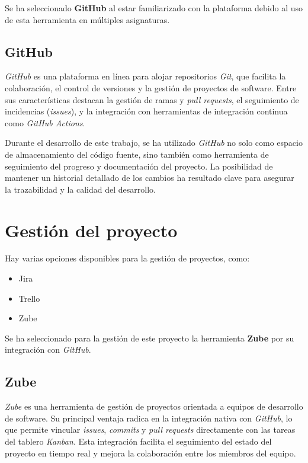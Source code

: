 Se ha seleccionado \textbf{GitHub} al estar familiarizado con la plataforma debido al uso de esta herramienta en múltiples asignaturas.

\subsection{GitHub}

\textit{GitHub} es una plataforma en línea para alojar repositorios \textit{Git}, que
facilita la colaboración, el control de versiones y la gestión de proyectos de software. 
Entre sus características destacan la gestión de ramas y \textit{pull requests}, el seguimiento 
de incidencias (\textit{issues}), y la integración con herramientas de integración continua como 
\textit{GitHub Actions}.

Durante el desarrollo de este trabajo, se ha utilizado \textit{GitHub} no solo como espacio de almacenamiento del código fuente, 
sino también como herramienta de seguimiento del progreso y documentación del proyecto. 
La posibilidad de mantener un historial detallado de los cambios ha resultado clave para asegurar la 
trazabilidad y la calidad del desarrollo.

\section{Gestión del proyecto}

Hay varias opciones disponibles para la gestión de proyectos, como:

\begin{itemize}
    \item Jira~\cite{web:jira}
    \item Trello~\cite{web:trello}
    \item Zube~\cite{web:zube}
\end{itemize}

Se ha seleccionado para la gestión de este proyecto la herramienta \textbf{Zube} por su integración
con \textit{GitHub}.

\subsection{Zube}

\textit{Zube} es una herramienta de gestión de proyectos orientada a equipos de desarrollo de software. Su principal ventaja radica en 
la integración nativa con \textit{GitHub}, lo que permite vincular \textit{issues}, \textit{commits} y \textit{pull requests} directamente con las tareas del 
tablero \textit{Kanban}. Esta integración facilita el seguimiento del estado del proyecto en tiempo real y mejora la colaboración 
entre los miembros del equipo.

